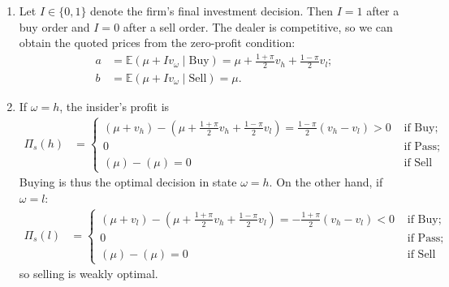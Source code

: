 \begin{solution}
\begin{enumerate}[label=(\alph{enumi})]
		\item 
		Let $I \in \{0,1\}$ denote the firm's final investment decision. Then $I=1$ after a buy order and $I=0$ after a sell order. The dealer is competitive, so we can obtain the quoted prices from the zero-profit condition:
		\begin{align}
			a &= \mathbb{E}(\mu + I v_\omega \mid \text{Buy}) = \mu + \frac{1+\pi}{2} v_h + \frac{1-\pi}{2} v_l;
			\label{eq:fbask}
			\\
			b &= \mathbb{E}(\mu + I v_\omega \mid \text{Sell}) = \mu.
			\label{eq:fbbid}
		\end{align}
		
		\item 
		If $\omega = h$, the insider's profit is
		\begin{align*}
			\Pi_s(h) &= \begin{cases}
				(\mu + v_h) - \left( \mu + \frac{1+\pi}{2} v_h + \frac{1-\pi}{2} v_l \right)
				= \frac{1-\pi}{2} (v_h - v_l) > 0
				& \text{ if Buy};
				\\
				0 & \text{ if Pass};
				\\
				(\mu) - (\mu) = 0 & \text{ if Sell}
			\end{cases}
		\end{align*}
		Buying is thus the optimal decision in state $\omega = h$. On the other hand, if $\omega = l$:
		\begin{align*}
			\Pi_s(l) &= \begin{cases}
				(\mu + v_l) - \left( \mu + \frac{1+\pi}{2} v_h + \frac{1-\pi}{2} v_l \right)
				= -\frac{1+\pi}{2} (v_h - v_l) < 0
				& \text{ if Buy};
				\\
				0 & \text{ if Pass};
				\\
				(\mu) - (\mu) = 0 & \text{ if Sell}
			\end{cases}
		\end{align*}
		so selling is weakly optimal. 
		

\end{enumerate}
\end{solution}
